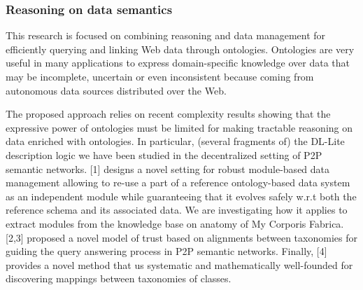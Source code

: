 \subsubsection{Reasoning on data semantics}

This research is focused on combining reasoning and data management for efficiently querying and linking Web data through ontologies. Ontologies are very useful in many applications to express domain-specific knowledge over data that may be incomplete, uncertain or even inconsistent because coming from autonomous data sources distributed over the Web. 

The proposed approach relies on recent complexity  results showing that the expressive power of ontologies must be limited for making tractable reasoning on data enriched with ontologies. In particular,  (several fragments of) the DL-Lite description logic  we have been studied  in the decentralized setting of P2P semantic networks. [1] designs a novel setting for robust module-based data management allowing to re-use a part of a  reference ontology-based data system as an independent module while guaranteeing that it evolves safely w.r.t both the reference  schema and its associated data. We are investigating how it applies to extract modules from the knowledge base on anatomy of My Corporis Fabrica.  [2,3]  proposed a novel model of trust based on alignments between taxonomies for guiding the query answering process in P2P semantic networks. Finally,  [4]  provides a novel method that us systematic and mathematically well-founded for discovering mappings between taxonomies of classes. 


